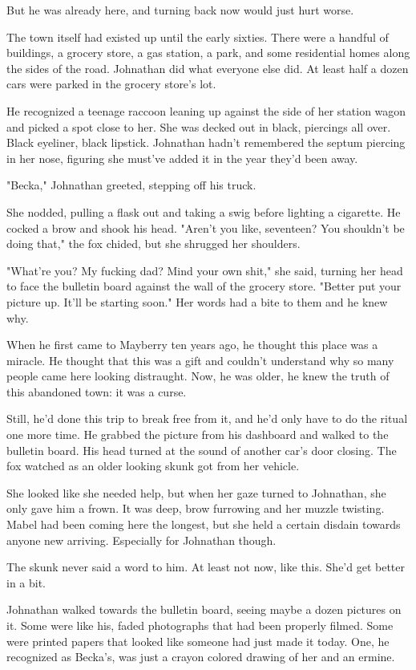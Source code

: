 But he was already here, and turning back now would just hurt worse.

The town itself had existed up until the early sixties. There were a handful of buildings, a grocery store, a gas station, a park, and some residential homes along the sides of the road. Johnathan did what everyone else did. At least half a dozen cars were parked in the grocery store's lot.

He recognized a teenage raccoon leaning up against the side of her station wagon and picked a spot close to her. She was decked out in black, piercings all over. Black eyeliner, black lipstick. Johnathan hadn't remembered the septum piercing in her nose, figuring she must've added it in the year they'd been away.

"Becka," Johnathan greeted, stepping off his truck.

She nodded, pulling a flask out and taking a swig before lighting a cigarette. He cocked a brow and shook his head. "Aren't you like, seventeen? You shouldn't be doing that," the fox chided, but she shrugged her shoulders.

"What're you? My fucking dad? Mind your own shit," she said, turning her head to face the bulletin board against the wall of the grocery store. "Better put your picture up. It'll be starting soon." Her words had a bite to them and he knew why.

When he first came to Mayberry ten years ago, he thought this place was a miracle. He thought that this was a gift and couldn't understand why so many people came here looking distraught. Now, he was older, he knew the truth of this abandoned town: it was a curse.

Still, he'd done this trip to break free from it, and he'd only have to do the ritual one more time. He grabbed the picture from his dashboard and walked to the bulletin board. His head turned at the sound of another car's door closing. The fox watched as an older looking skunk got from her vehicle.

She looked like she needed help, but when her gaze turned to Johnathan, she only gave him a frown. It was deep, brow furrowing and her muzzle twisting. Mabel had been coming here the longest, but she held a certain disdain towards anyone new arriving. Especially for Johnathan though.

The skunk never said a word to him. At least not now, like this. She'd get better in a bit.

Johnathan walked towards the bulletin board, seeing maybe a dozen pictures on it. Some were like his, faded photographs that had been properly filmed. Some were printed papers that looked like someone had just made it today. One, he recognized as Becka's, was just a crayon colored drawing of her and an ermine.

